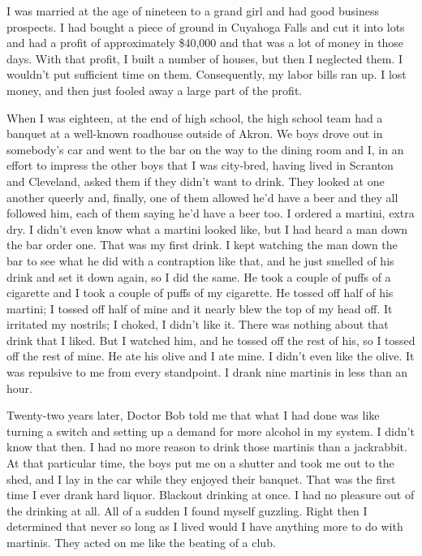 \begin{biblechapter}
\verse I was married at the age of nineteen to a grand girl 
    and had good business prospects.
\verse I had bought a piece of ground in Cuyahoga Falls 
    and cut it into lots 
    and had a profit of approximately \$40,000 
    and that was a lot of money in those days.
\verse With that profit, I built a number of houses, 
    but then I neglected them. 
\verse I wouldn’t put sufficient time on them. 
\verse Consequently, my labor bills ran up.
\verse I lost money, 
    and then just fooled away a large part of the profit.
\end{biblechapter}


\begin{biblechapter}
\verse When I was eighteen, 
    at the end of high school, 
    the high school team had a banquet 
    at a well-known roadhouse outside of Akron.
\verse We boys drove out in somebody’s car 
    and went to the bar on the way to the dining room 
    and I, in an effort to impress the other boys 
    that I was city-bred, 
    having lived in Scranton and Cleveland, 
    asked them if they didn’t want to drink. 
\verse They looked at one another queerly and, finally, 
    one of them allowed he’d have a beer 
    and they all followed him, 
    each of them saying he’d have a beer too.
\verse I ordered a martini, extra dry.
\verse I didn’t even know what a martini looked like, 
    but I had heard a man down the bar order one. 
\verse That was my first drink.
\verse I kept watching the man down the bar 
    to see what he did with a contraption like that, 
    and he just smelled of his drink and set it down again, 
    so I did the same.
\verse He took a couple of puffs of a cigarette 
    and I took a couple of puffs of my cigarette.
\verse He tossed off half of his martini; 
    I tossed off half of mine 
    and it nearly blew the top of my head off.
\verse It irritated my nostrils; 
    I choked, I didn’t like it.
\verse There was nothing about that drink that I liked.
\verse But I watched him, and he tossed off the rest of his, 
    so I tossed off the rest of mine.
\verse He ate his olive and I ate mine.
\verse I didn’t even like the olive.
\verse It was repulsive to me from every standpoint.
\verse I drank nine martinis in less than an hour.

\verse Twenty-two years later, 
    Doctor Bob told me that what I had done 
    was like turning a switch 
    and setting up a demand for more alcohol in my system.
\verse I didn’t know that then.
\verse I had no more reason to drink those martinis than a jackrabbit.
\verse At that particular time, 
    the boys put me on a shutter 
    and took me out to the shed, 
    and I lay in the car while they enjoyed their banquet.
\verse That was the first time I ever drank hard liquor.
\verse Blackout drinking at once.
\verse I had no pleasure out of the drinking at all.
\verse All of a sudden I found myself guzzling.
\verse Right then I determined that never so long as I lived 
    would I have anything more to do with martinis.
\verse They acted on me like the beating of a club.


\end{biblechapter}
